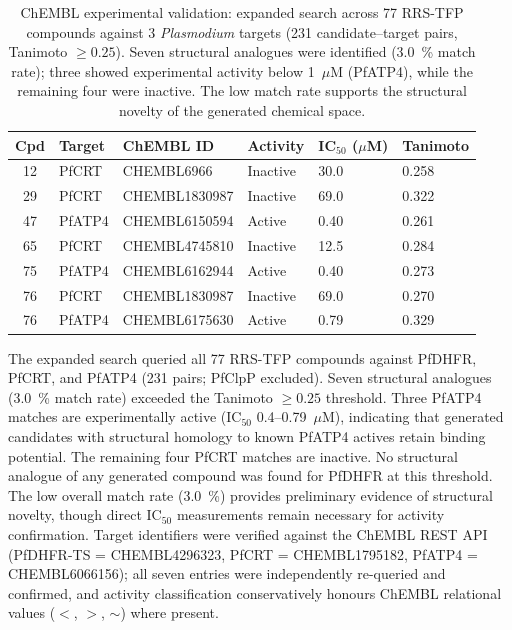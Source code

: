 \documentclass[11pt,a4paper]{article}
\begin{document}
\begin{table}[htbp]
\centering
\caption{ChEMBL experimental validation: expanded search across 77 RRS-TFP compounds against 3 \textit{Plasmodium} targets (231 candidate--target pairs, Tanimoto $\geq 0.25$). Seven structural analogues were identified (\qty{3.0}{\percent} match rate); three showed experimental activity below 1~$\mu$M (PfATP4), while the remaining four were inactive. The low match rate supports the structural novelty of the generated chemical space.}
\label{tab:chembl_validation}
\small
\begin{tabularx}{\textwidth}{c l l l l l}
\toprule
Cpd & Target & ChEMBL ID & Activity & {IC$_{50}$ ($\mu$M)} & Tanimoto \\
\midrule
12 & PfCRT & CHEMBL6966 & Inactive & 30.0 & 0.258 \\
29 & PfCRT & CHEMBL1830987 & Inactive & 69.0 & 0.322 \\
47 & PfATP4 & CHEMBL6150594 & Active & 0.40 & 0.261 \\
65 & PfCRT & CHEMBL4745810 & Inactive & 12.5 & 0.284 \\
75 & PfATP4 & CHEMBL6162944 & Active & 0.40 & 0.273 \\
76 & PfCRT & CHEMBL1830987 & Inactive & 69.0 & 0.270 \\
76 & PfATP4 & CHEMBL6175630 & Active & 0.79 & 0.329 \\
\bottomrule
\end{tabularx}
\vspace{1mm}
\footnotesize The expanded search queried all 77 RRS-TFP compounds against PfDHFR, PfCRT, and PfATP4 (231 pairs; PfClpP excluded). Seven structural analogues (\qty{3.0}{\percent} match rate) exceeded the Tanimoto $\geq 0.25$ threshold. Three PfATP4 matches are experimentally active (IC$_{50}$ 0.4--0.79~$\mu$M), indicating that generated candidates with structural homology to known PfATP4 actives retain binding potential. The remaining four PfCRT matches are inactive. No structural analogue of any generated compound was found for PfDHFR at this threshold. The low overall match rate (\qty{3.0}{\percent}) provides preliminary evidence of structural novelty, though direct IC$_{50}$ measurements remain necessary for activity confirmation. Target identifiers were verified against the ChEMBL REST API (PfDHFR-TS = CHEMBL4296323, PfCRT = CHEMBL1795182, PfATP4 = CHEMBL6066156); all seven entries were independently re-queried and confirmed, and activity classification conservatively honours ChEMBL relational values ($<$, $>$, $\sim$) where present.
\end{table}
\end{document}
